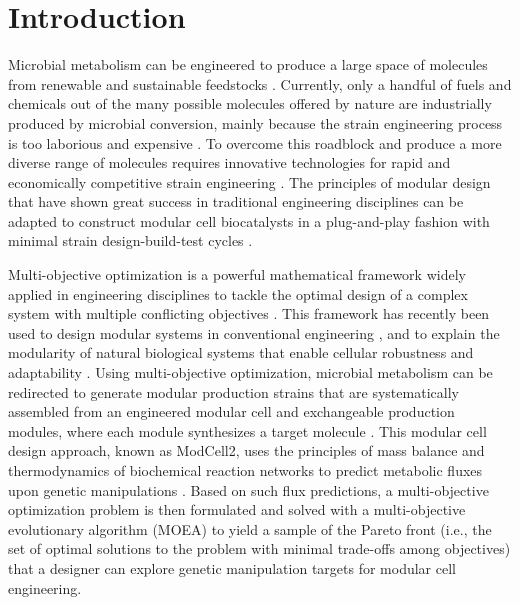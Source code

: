 \section{Introduction}

Microbial metabolism can be engineered to produce a large space of molecules from renewable and sustainable feedstocks \citep{lee2019}.
Currently, only a handful of fuels and chemicals out of the many possible molecules offered by nature are industrially produced by microbial conversion, mainly because the strain engineering process is too laborious and expensive \citep{nielsen2016}.
To overcome this roadblock and produce a more diverse range of molecules requires innovative technologies for rapid and economically competitive strain engineering \citep{trinh2016, nielsen2016, lee2019}.
The principles of modular design that have shown great success in traditional engineering disciplines can be adapted to construct modular cell biocatalysts in a plug-and-play fashion with minimal strain design-build-test cycles \citep{garcia2019b}.

Multi-objective optimization is a powerful mathematical framework widely applied in engineering disciplines to tackle the optimal design of a complex system with multiple conflicting objectives \citep{coello2004, rangaiah2009}.
This framework has recently been used to design modular systems in conventional  engineering \citep{helmer2010}, and to explain the modularity of natural biological systems that enable cellular robustness and adaptability \citep{kitano2004, kashtan2007, clune2013, shoval2012, schuetz2012}.
Using multi-objective optimization, microbial metabolism can be redirected to generate modular production strains that are systematically assembled from an engineered modular cell and exchangeable production modules, where each module synthesizes a target molecule \citep{garcia2019}. This modular cell design approach, known as ModCell2, uses the principles of mass balance and thermodynamics of biochemical reaction networks to predict metabolic fluxes upon genetic manipulations \citep{garcia2019, garcia2019c}.
Based on such flux predictions, a multi-objective optimization problem is then formulated and solved with a multi-objective evolutionary algorithm (MOEA)\citep{zhou2011,deb2002} to yield a sample of the Pareto front (i.e., the set of optimal solutions to the problem with minimal trade-offs among objectives) that a designer can explore genetic manipulation targets for modular cell engineering.

